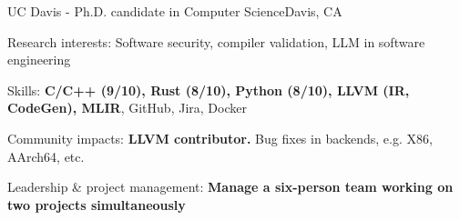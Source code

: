 \renewcommand{\timeInterval}{\DTMdisplaydate{2019}{9}{27}{-1} - }

\ifx\lang\eng
	\begin{rSubsection}{UC Davis}{\timeInterval}{Ph.D. candidate in Computer Science}{Davis, CA}
		\item Research interests: Software security, compiler validation, LLM in software engineering
		\item Skills: \textbf{C/C++ (9/10), Rust (8/10), Python (8/10), LLVM (IR, CodeGen), MLIR}, GitHub, Jira, Docker
		\item Community impacts: \textbf{LLVM contributor.} Bug fixes in backends, e.g. X86, AArch64, etc.
		\item Leadership \& project management: \textbf{Manage a six-person team working on two projects simultaneously}
	\end{rSubsection}
	\vspace{-0.1em}
\else
\fi

\renewcommand{\timeInterval}{}